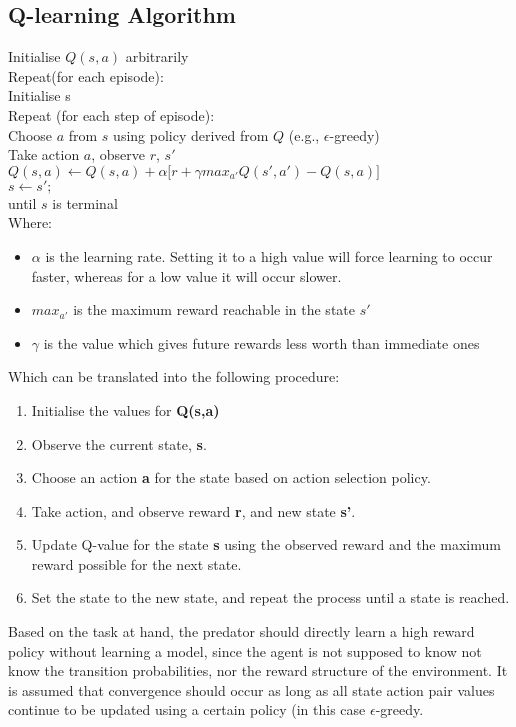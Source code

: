 \documentclass[11pt]{article}
\begin{document}
\subsection{Q-learning Algorithm}
\noindent Initialise $Q(s,a)$ arbitrarily\\
Repeat(for each episode):\\
\hspace*{10mm} Initialise s\\
\hspace*{10mm} Repeat (for each step of episode):\\
\hspace*{20mm} Choose $a$ from $s$ using policy derived from $Q$ (e.g., $\epsilon$-greedy)\\
\hspace*{20mm} Take action $a$, observe $r$, $s'$\\
\hspace*{20mm} $Q(s,a) \leftarrow Q(s,a) + \alpha \lbrack r + \gamma max_{a'} Q(s',a') - Q(s,a)\rbrack$\\
\hspace*{20mm} $s \leftarrow s';$\\
\hspace*{10mm} until $s$ is terminal\\


\noindent Where:
\begin{itemize}
	\item $\alpha$ is the learning rate. Setting it to a high value will force learning to occur faster, whereas for a low value it will occur slower.
	\item $max_{a'}$ is the maximum reward reachable in the state $s'$
	\item $\gamma$ is the value which gives future rewards less worth than immediate ones
\end{itemize}
\vspace*{10mm}


\noindent Which can be translated into the following procedure:
\begin{enumerate}
	\item Initialise the values for \textbf{Q(s,a)}
	\item Observe the current state, \textbf{s}.
	\item Choose an action \textbf{a} for the state based on action selection policy.
	\item Take action, and observe reward \textbf{r}, and new state \textbf{s'}.
	\item Update Q-value for the state \textbf{s} using the observed reward and the maximum reward possible for the next state.
	\item Set the state to the new state, and repeat the process until a state is reached.
\end{enumerate}


Based on the task at hand, the predator should directly learn a high reward policy without learning a model, since the agent is not supposed to know not know the transition probabilities, nor the reward structure of the environment. It is assumed that convergence should occur as long as all state action pair values continue to be updated using a certain policy (in this case $\epsilon$-greedy. 
\end{document}
